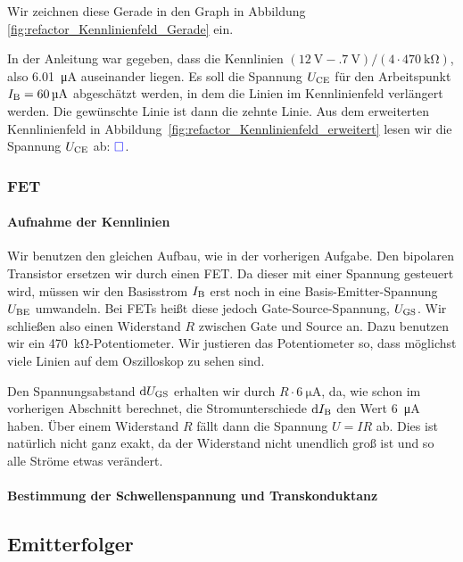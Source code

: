 Wir zeichnen diese Gerade in den Graph in Abbildung
\ref{fig:refactor_Kennlinienfeld_Gerade} ein.

In der Anleitung war gegeben, dass die Kennlinien $(\SI{12}\volt -
\SI{.7}\volt)/(4 \cdot \SI{470}{\kilo\ohm})$, also \SI{6.01}{\micro\ampere}
auseinander liegen. Es soll die Spannung $U_\text{CE}$ für den Arbeitspunkt $I_\text{B} =
\SI{60}{\micro\ampere}$ abgeschätzt werden, in dem die Linien im Kennlinienfeld
verlängert werden. Die gewünschte Linie ist dann die zehnte Linie. Aus dem
erweiterten Kennlinienfeld in
Abbildung~\ref{fig:refactor_Kennlinienfeld_erweitert} lesen wir die Spannung
$U_\text{CE}$ ab: $\textcolor{blue}{\square}$.

\subsubsection{FET}

\paragraph{Aufnahme der Kennlinien}

Wir benutzen den gleichen Aufbau, wie in der vorherigen Aufgabe. Den bipolaren
Transistor ersetzen wir durch einen FET. Da dieser mit einer Spannung gesteuert
wird, müssen wir den Basisstrom $I_\text{B}$ erst noch in eine Basis-Emitter-Spannung
$U_\text{BE}$ umwandeln. Bei FETs heißt diese jedoch Gate-Source-Spannung, $U_\text{GS}$. Wir
schließen also einen Widerstand $R$ zwischen Gate und Source an. Dazu benutzen
wir ein \SI{470}{\kilo\ohm}-Potentiometer. Wir justieren das Potentiometer so,
dass möglichst viele Linien auf dem Oszilloskop zu sehen sind.

Den Spannungsabstand $\dif\UGS$ erhalten wir durch $R \cdot
\SI{6}{\micro\ampere}$, da, wie schon im vorherigen Abschnitt berechnet, die
Stromunterschiede $\dif\IB$ den Wert \SI{6}{\micro\ampere} haben. Über einem
Widerstand $R$ fällt dann die Spannung $U = IR$ ab. Dies ist natürlich nicht
ganz exakt, da der Widerstand nicht unendlich groß ist und so alle Ströme etwas
verändert.

\paragraph{Bestimmung der Schwellenspannung und Transkonduktanz}

\fehlt

\FloatBarrier
\subsection{Emitterfolger}

